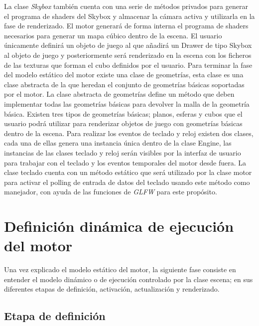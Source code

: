\documentclass[a4paper]{book}
\begin{document}
La clase \textit{Skybox} también cuenta con una serie de métodos privados para generar el programa de shaders del Skybox y almacenar la cámara
activa y utilizarla en la fase de renderizado. El motor generará de forma interna el programa de shaders necesarios para generar un mapa
cúbico dentro de la escena. El usuario únicamente definirá un objeto de juego al que añadirá un Drawer de tipo Skybox al objeto de juego y
posteriormente será renderizado en la escena con los ficheros de las texturas que forman el cubo definidos por el usuario. Para terminar la
fase del modelo estático del motor existe una clase de geometrías, esta clase es una clase abstracta de la que heredan el
conjunto de geometrías básicas soportadas por el motor. La clase abstracta de geometrías define un método que deben implementar todas las
geometrías básicas para devolver la malla de la geometría básica. Existen tres tipos de geometrías básicas; planos, esferas y cubos que el
usuario podrá utilizar para renderizar objetos de juego con geometrías básicas dentro de la escena. Para realizar los eventos de teclado y reloj
existen dos clases, cada una de ellas genera una instancia única dentro de la clase Engine, las instancias de las clases teclado y reloj serán
visibles por la interfaz de usuario para trabajar con el teclado y los eventos temporales del motor desde fuera. La clase teclado cuenta con un método
estático que será utilizado por la clase motor para activar el polling de entrada de datos del teclado usando este método como manejador,
con ayuda de las funciones de \textit{GLFW} para este propósito.

\section{Definición dinámica de ejecución del motor}
\label{sec:Dinamica}

Una vez explicado el modelo estático del motor, la siguiente fase consiste en entender el modelo dinámico o de ejecución controlado por la
clase escena; en sus diferentes etapas de definición, activación, actualización y renderizado.

\subsection{Etapa de definición}
\label{subsec:definicion}
\end{document}
